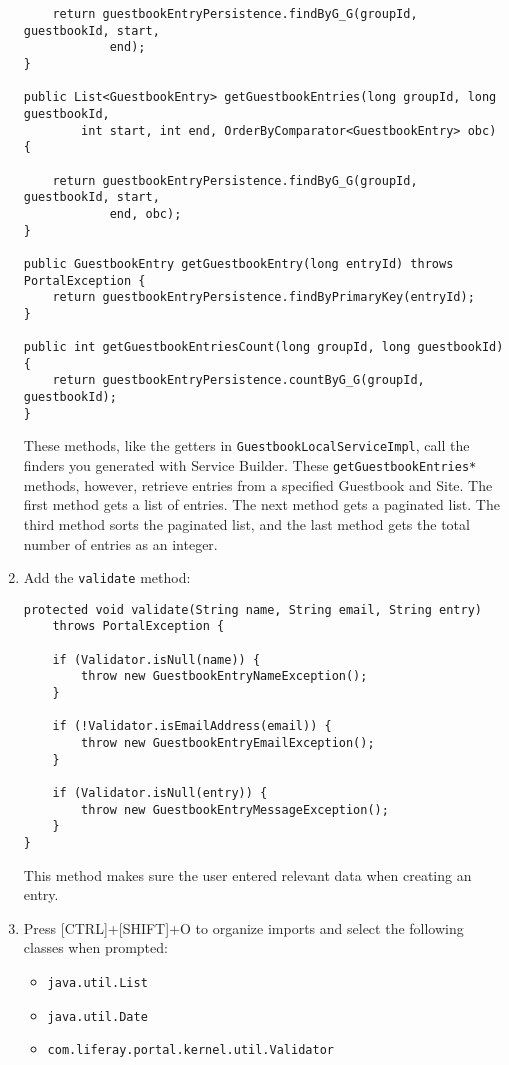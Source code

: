 \begin{enumerate}
\begin{verbatim}
    return guestbookEntryPersistence.findByG_G(groupId, guestbookId, start,
            end);
}

public List<GuestbookEntry> getGuestbookEntries(long groupId, long guestbookId,
        int start, int end, OrderByComparator<GuestbookEntry> obc) {

    return guestbookEntryPersistence.findByG_G(groupId, guestbookId, start,
            end, obc);
}

public GuestbookEntry getGuestbookEntry(long entryId) throws PortalException {
    return guestbookEntryPersistence.findByPrimaryKey(entryId);
}

public int getGuestbookEntriesCount(long groupId, long guestbookId) {
    return guestbookEntryPersistence.countByG_G(groupId, guestbookId);
}
\end{verbatim}

  These methods, like the getters in \texttt{GuestbookLocalServiceImpl},
  call the finders you generated with Service Builder. These
  \texttt{getGuestbookEntries*} methods, however, retrieve entries from
  a specified Guestbook and Site. The first method gets a list of
  entries. The next method gets a paginated list. The third method sorts
  the paginated list, and the last method gets the total number of
  entries as an integer.
\item
  Add the \texttt{validate} method:

\begin{verbatim}
protected void validate(String name, String email, String entry)
    throws PortalException {

    if (Validator.isNull(name)) {
        throw new GuestbookEntryNameException();
    }

    if (!Validator.isEmailAddress(email)) {
        throw new GuestbookEntryEmailException();
    }

    if (Validator.isNull(entry)) {
        throw new GuestbookEntryMessageException();
    }
}
\end{verbatim}

  This method makes sure the user entered relevant data when creating an
  entry.
\item
  Press {[}CTRL{]}+{[}SHIFT{]}+O to organize imports and select the
  following classes when prompted:

  \begin{itemize}
  \tightlist
  \item
    \texttt{java.util.List}
  \item
    \texttt{java.util.Date}
  \item
    \texttt{com.liferay.portal.kernel.util.Validator}
  \end{itemize}
\end{enumerate}

